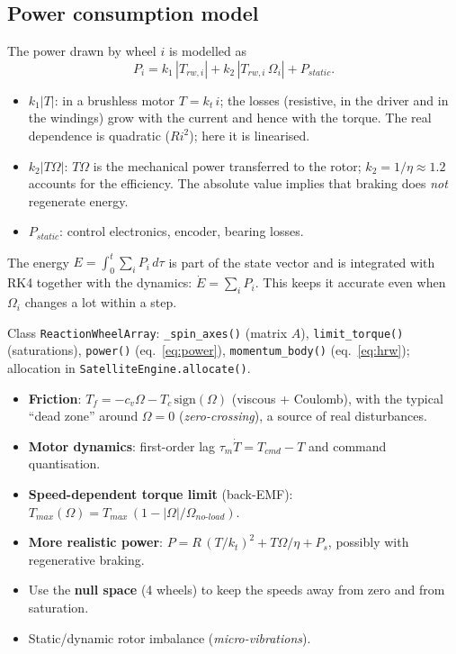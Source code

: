 \documentclass[11pt,a4paper]{article}
\newcommand{\code}[1]{\texttt{#1}}
\begin{document}
\subsection{Power consumption model}
The power drawn by wheel $i$ is modelled as
\begin{equation}
  P_i = k_1\,|T_{rw,i}| + k_2\,|T_{rw,i}\,\Omega_i| + P_{static}.
  \label{eq:power}
\end{equation}
\begin{itemize}
  \item $k_1|T|$: in a brushless motor $T = k_t\,i$; the losses (resistive,
        in the driver and in the windings) grow with the current and hence with
        the torque. The real dependence is quadratic ($R i^2$); here it is
        linearised.
  \item $k_2|T\Omega|$: $T\Omega$ is the mechanical power transferred to the rotor;
        $k_2 = 1/\eta \approx 1.2$ accounts for the efficiency. The absolute
        value implies that braking does \emph{not} regenerate energy.
  \item $P_{static}$: control electronics, encoder, bearing losses.
\end{itemize}
The energy $E = \int_0^t \sum_i P_i\,d\tau$ is part of the state vector and is
integrated with RK4 together with the dynamics: $\dot E = \sum_i P_i$. This keeps
it accurate even when $\Omega_i$ changes a lot within a step.

\begin{incode}
Class \code{ReactionWheelArray}: \code{\_spin\_axes()} (matrix $A$),
\code{limit\_torque()} (saturations), \code{power()} (eq.~\ref{eq:power}),
\code{momentum\_body()} (eq.~\ref{eq:hrw}); allocation in
\code{SatelliteEngine.allocate()}.
\end{incode}

\begin{improvement}
\begin{itemize}[nosep]
  \item \textbf{Friction}: $T_f = -c_v\Omega - T_c\,\mathrm{sign}(\Omega)$
        (viscous + Coulomb), with the typical ``dead zone'' around
        $\Omega=0$ (\emph{zero-crossing}), a source of real disturbances.
  \item \textbf{Motor dynamics}: first-order lag
        $\tau_m\dot T = T_{cmd}-T$ and command quantisation.
  \item \textbf{Speed-dependent torque limit} (back-EMF):
        $T_{max}(\Omega) = T_{max}\,(1-|\Omega|/\Omega_{no\text{-}load})$.
  \item \textbf{More realistic power}: $P = R\,(T/k_t)^2 + T\Omega/\eta + P_s$,
        possibly with regenerative braking.
  \item Use the \textbf{null space} (4 wheels) to keep the speeds away from
        zero and from saturation.
  \item Static/dynamic rotor imbalance (\emph{micro-vibrations}).
\end{itemize}
\end{improvement}
\end{document}
